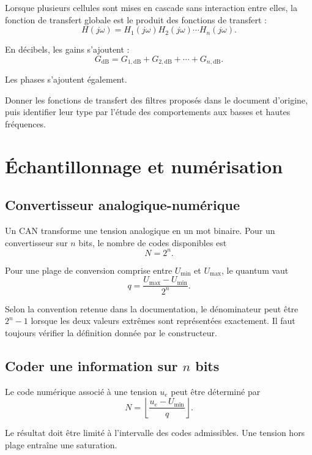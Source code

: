 Lorsque plusieurs cellules sont mises en cascade sans interaction entre elles, la fonction de transfert globale est le produit des fonctions de transfert :
\[
H(j\omega)=H_1(j\omega)H_2(j\omega)\cdots H_n(j\omega).
\]

En décibels, les gains s'ajoutent :
\[
G_{\mathrm{dB}}=G_{1,\mathrm{dB}}+G_{2,\mathrm{dB}}+\cdots+G_{n,\mathrm{dB}}.
\]

Les phases s'ajoutent également.

\begin{application}
Donner les fonctions de transfert des filtres proposés dans le document d'origine, puis identifier leur type par l'étude des comportements aux basses et hautes fréquences.
\end{application}

\section{Échantillonnage et numérisation}\label{sec:elec-numerisation}

\subsection{Convertisseur analogique-numérique}

Un CAN transforme une tension analogique en un mot binaire. Pour un convertisseur sur $n$ bits, le nombre de codes disponibles est
\[
N=2^n.
\]

Pour une plage de conversion comprise entre $U_{\min}$ et $U_{\max}$, le quantum vaut
\[
q=\frac{U_{\max}-U_{\min}}{2^n}.
\]

Selon la convention retenue dans la documentation, le dénominateur peut être $2^n-1$ lorsque les deux valeurs extrêmes sont représentées exactement. Il faut toujours vérifier la définition donnée par le constructeur.

\subsection{Coder une information sur $n$ bits}

Le code numérique associé à une tension $u_e$ peut être déterminé par
\[
N=\left\lfloor\frac{u_e-U_{\min}}{q}\right\rfloor.
\]

Le résultat doit être limité à l'intervalle des codes admissibles. Une tension hors plage entraîne une saturation.

